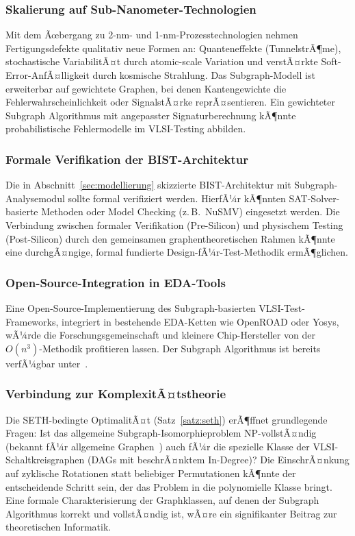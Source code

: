 ﻿\documentclass[a4paper,12pt]{article}
\theoremstyle{definition}
\begin{document}
\subsubsection{Skalierung auf Sub-Nanometer-Technologien}

Mit dem Ãœbergang zu 2-nm- und 1-nm-Prozesstechnologien nehmen
Fertigungs\-defekte qualitativ neue Formen an: Quanteneffekte
(Tunnel\-strÃ¶me), stochastische VariabilitÃ¤t durch atomic-scale
Variation und verstÃ¤rkte Soft-Error-AnfÃ¤lligkeit durch kosmische
Strahlung. Das Subgraph-Modell ist erweiterbar auf gewichtete Graphen,
bei denen Kantengewichte die Fehlerwahrscheinlichkeit oder
SignalstÃ¤rke reprÃ¤sentieren. Ein gewichteter Subgraph Algorithmus
mit angepasster Signaturberechnung kÃ¶nnte probabilistische
Fehlermodelle im VLSI-Testing abbilden.

\subsubsection{Formale Verifikation der BIST-Architektur}

Die in Abschnitt~\ref{sec:modellierung} skizzierte BIST-Architektur
mit Subgraph-Analysemodul sollte formal verifiziert werden.
HierfÃ¼r kÃ¶nnten SAT-Solver-basierte Methoden oder Model Checking
(z.\,B.\ NuSMV) eingesetzt werden. Die Verbindung zwischen formaler
Verifikation (Pre-Silicon) und physischem Testing (Post-Silicon)
durch den gemeinsamen graphen\-theoretischen Rahmen kÃ¶nnte eine
durchgÃ¤ngige, formal fundierte Design-fÃ¼r-Test-Methodik ermÃ¶glichen.

\subsubsection{Open-Source-Integration in EDA-Tools}

Eine Open-Source-Implementierung des Subgraph-basierten
VLSI-Test-Frameworks, integriert in bestehende EDA-Ketten wie
OpenROAD oder Yosys, wÃ¼rde die Forschungsgemeinschaft und kleinere
Chip-Hersteller von der $O(n^3)$-Methodik profitieren lassen.
Der Subgraph Algorithmus ist bereits verfÃ¼gbar
unter~\cite{epp2026subgraph_code}.

\subsubsection{Verbindung zur KomplexitÃ¤tstheorie}

Die SETH-bedingte OptimalitÃ¤t (Satz~\ref{satz:seth}) erÃ¶ffnet
grundlegende Fragen: Ist das allgemeine Subgraph-Isomorphieproblem
NP-vollstÃ¤ndig (bekannt fÃ¼r allgemeine Graphen~\cite{cook1971complexity})
auch fÃ¼r die spezielle Klasse der VLSI-Schaltkreisgraphen (DAGs mit
beschrÃ¤nktem In-Degree)? Die EinschrÃ¤nkung auf zyklische Rotationen
statt beliebiger Permutationen kÃ¶nnte der entscheidende Schritt sein,
der das Problem in die polynomielle Klasse bringt. Eine formale
Charakterisierung der Graphklassen, auf denen der Subgraph Algorithmus
korrekt und vollstÃ¤ndig ist, wÃ¤re ein signifikanter Beitrag zur
theoretischen Informatik.
\end{document}
